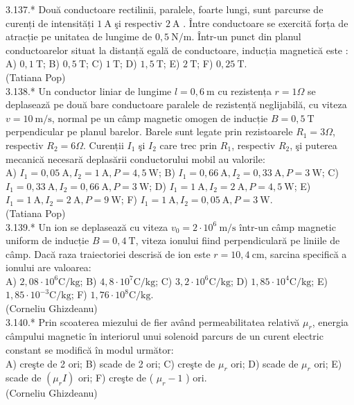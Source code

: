 3.137.* Două conductoare rectilinii, paralele, foarte lungi, sunt parcurse de curenți de intensități $1 \mathrm{~A}$ şi respectiv $2 \mathrm{~A}$ . Între conductoare se exercită forța de atracție pe unitatea de lungime de $0,5 \mathrm{~N} / \mathrm{m}$. Într-un punct din planul conductoarelor situat la distanță egală de conductoare, inducția magnetică este :\\ A) $0,1 \mathrm{~T}$; B) $0,5 \mathrm{~T}$; C) $1 \mathrm{~T}$; D) $1,5 \mathrm{~T}$; E) $2 \mathrm{~T}$; F) $0,25 \mathrm{~T}$.\\ (Tatiana Pop)\\

3.138.* Un conductor liniar de lungime $l=0,6 \mathrm{~m}$ cu rezistența $r=1 \Omega$ se deplasează pe două bare conductoare paralele de rezistență neglijabilă, cu viteza $v=10 \mathrm{~m} / \mathrm{s}$, normal pe un câmp magnetic omogen de inducție $B=0,5 \mathrm{~T}$ perpendicular pe planul barelor. Barele sunt legate prin rezistoarele $R_{1}=3 \Omega$, respectiv $R_{2}=6 \Omega$. Curenții $I_{1}$ şi $I_{2}$ care trec prin $R_{1}$, respectiv $R_{2}$, şi puterea mecanică necesară deplasării conductorului mobil au valorile:\\ A) $I_{1}=0,05 \mathrm{~A}, I_{2}=1 \mathrm{~A}, P=4,5 \mathrm{~W}$; B) $I_{1}=0,66 \mathrm{~A}, I_{2}=0,33 \mathrm{~A}, P=3 \mathrm{~W}$; C) $I_{1}=0,33 \mathrm{~A}, I_{2}=0,66 \mathrm{~A}, P=3 \mathrm{~W}$; D) $I_{1}=1 \mathrm{~A}, I_{2}=2 \mathrm{~A}, P=4,5 \mathrm{~W}$; E) $I_{1}=1 \mathrm{~A}, I_{2}=2 \mathrm{~A}, P=9 \mathrm{~W}$; F) $I_{1}=1 \mathrm{~A}, I_{2}=0,05 \mathrm{~A}, P=3 \mathrm{~W}$.\\ (Tatiana Pop)\\

3.139.* Un ion se deplasează cu viteza $v_{0}=2 \cdot 10^{6} \mathrm{~m} / \mathrm{s}$ într-un câmp magnetic uniform de inducție $B=0,4 \mathrm{~T}$, viteza ionului fiind perpendiculară pe liniile de câmp. Dacă raza traiectoriei descrisă de ion este $r=10,4 \mathrm{~cm}$, sarcina specifică a ionului are valoarea:\\ A) $2,08 \cdot 10^{6} \mathrm{C} / \mathrm{kg}$; B) $4,8 \cdot 10^{7} \mathrm{C} / \mathrm{kg}$; C) $3,2 \cdot 10^{6} \mathrm{C} / \mathrm{kg}$; D) $1,85 \cdot 10^{4} \mathrm{C} / \mathrm{kg}$; E) $1,85 \cdot 10^{-3} \mathrm{C} / \mathrm{kg}$; F) $1,76 \cdot 10^{8} \mathrm{C} / \mathrm{kg}$.\\ (Corneliu Ghizdeanu)\\

3.140.* Prin scoaterea miezului de fier având permeabilitatea relativă $\mu_{r}$, energia câmpului magnetic în interiorul unui solenoid parcurs de un curent electric constant se modifică în modul următor:\\ A) creşte de 2 ori; B) scade de 2 ori; C) creşte de $\mu_{r}$ ori; D) scade de $\mu_{r}$ ori; E) scade de $\left(\mu_{r} I\right)$ ori; F) creşte de ( $\mu_{r}-1$ ) ori.\\ (Corneliu Ghizdeanu)\\

